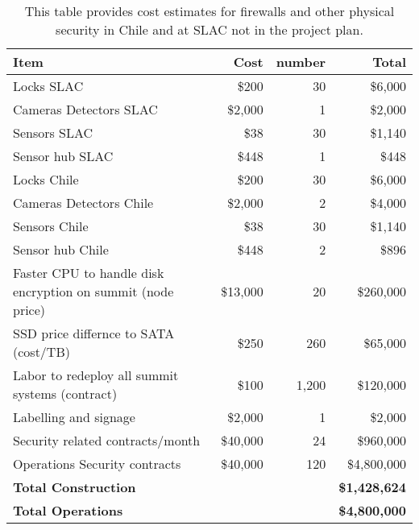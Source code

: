 \tiny \begin{longtable} {|p{}|r|r|r|} \caption{This table provides cost estimates for firewalls and other physical security in Chile and at SLAC not in the project plan. \label{tab:firewalls}}\\ 
\hline 
\textbf{Item}&\textbf{Cost}&\textbf{number}&\textbf{Total} \\ \hline
{Locks SLAC}&{\$200}&{30}&{\$6,000} \\ \hline
{Cameras Detectors  SLAC}&{\$2,000}&{1}&{\$2,000} \\ \hline
{Sensors SLAC}&{\$38}&{30}&{\$1,140} \\ \hline
{Sensor hub SLAC}&{\$448}&{1}&{\$448} \\ \hline
{Locks Chile}&{\$200}&{30}&{\$6,000} \\ \hline
{Cameras Detectors Chile}&{\$2,000}&{2}&{\$4,000} \\ \hline
{Sensors Chile}&{\$38}&{30}&{\$1,140} \\ \hline
{Sensor hub Chile}&{\$448}&{2}&{\$896} \\ \hline
{Faster CPU to handle disk encryption on summit (node price)}&{\$13,000}&{20}&{\$260,000} \\ \hline
{SSD price differnce to SATA (cost/TB)}&{\$250}&{260}&{\$65,000} \\ \hline
{Labor to redeploy all summit systems (contract)}&{\$100}&{1,200}&{\$120,000} \\ \hline
{Labelling and signage }&{\$2,000}&{1}&{\$2,000} \\ \hline
{Security related contracts/month}&{\$40,000}&{24}&{\$960,000} \\ \hline
{Operations Security contracts}&{\$40,000}&{120}&{\$4,800,000} \\ \hline
\textbf{Total Construction}&\textbf{}&\textbf{}&\textbf{\$1,428,624} \\ \hline
\textbf{Total Operations}&\textbf{}&\textbf{}&\textbf{\$4,800,000} \\ \hline
\end{longtable} \normalsize
